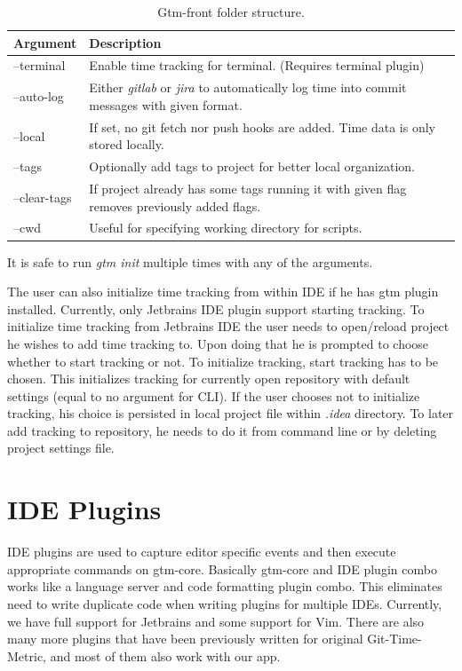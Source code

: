 \begin{table}[h]
    \centering
    \begin{tabular}{ | p{3cm} | p{10cm} |}
        \hline
        Argument & Description\\
        \hline
        --terminal & Enable time tracking for terminal. (Requires terminal plugin)\\
        \hline
        --auto-log & Either \textit{gitlab} or \textit{jira} to automatically log time
        into commit messages with given format.\\
        \hline
        --local & If set, no git fetch nor push hooks are added.
        Time data is only stored locally.\\
        \hline
        --tags & Optionally add tags to project for better local organization.\\
        \hline
        --clear-tags & If project already has some tags running it with given flag removes previously added flags.\\
        \hline
        --cwd & Useful for specifying working directory for scripts.\\
        \hline
    \end{tabular}
    \caption{Gtm-front folder structure.}
    \label{tab:gtm-init}
\end{table}
It is safe to run \textit{gtm init} multiple times with any of the arguments.

The user can also initialize time tracking from within IDE if he has gtm plugin installed.
Currently, only Jetbrains IDE plugin support starting tracking.
To initialize time tracking from Jetbrains IDE the user needs to open/reload project he wishes to add time tracking to.
Upon doing that he is prompted to choose whether to start tracking or not.
To initialize tracking, start tracking has to be chosen.
This initializes tracking for currently open repository with default settings (equal to no argument for CLI).
If the user chooses not to initialize tracking, his choice is persisted in local project file within \textit{.idea} directory.
To later add tracking to repository, he needs to do it from command line or by deleting project settings file.


\section{IDE Plugins}\label{sec:plugins}

IDE plugins are used to capture editor specific events and then execute appropriate commands on gtm-core.
Basically gtm-core and IDE plugin combo works like a language server and code formatting plugin combo.
This eliminates need to write duplicate code when writing plugins for multiple IDEs.
Currently, we have full support for Jetbrains and some support for Vim.
There are also many more plugins that have been previously written for original Git-Time-Metric, and most of them also work with our app.

